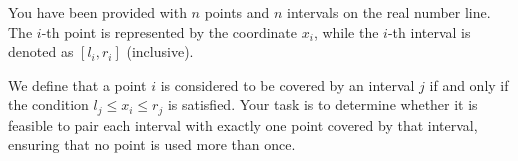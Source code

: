 You have been provided with $n$ points and $n$ intervals on the real number line. The $i$-th point is represented by the coordinate $x_i$, while the $i$-th interval is denoted as $[l_i, r_i]$ (inclusive).

We define that a point $i$ is considered to be covered by an interval $j$ if and only if the condition $l_j \leq x_i \leq r_j$ is satisfied. Your task is to determine whether it is feasible to pair each interval with exactly one point covered by that interval, ensuring that no point is used more than once.